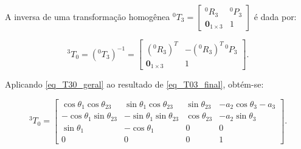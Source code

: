 


A inversa de uma transformação homogênea ${}^{0}T_{3}=\begin{bmatrix}{}^{0}R_{3} & {}^{0}P_{3}\\ \mathbf{0}_{1\times 3} & 1\end{bmatrix}$ é dada por:

\begin{equation}
{}^{3}T_{0} = ({}^{0}T_{3})^{-1}
=
\begin{bmatrix}
({}^{0}R_{3})^{T} & -({}^{0}R_{3})^{T}\,{}^{0}P_{3}\\
\mathbf{0}_{1\times 3} & 1
\end{bmatrix}.
\label{eq_T30_geral}
\end{equation}

Aplicando \eqref{eq_T30_geral} ao resultado de \eqref{eq_T03_final}, obtém-se:

\begin{equation}
{}^{3}T_{0} =
\begin{bmatrix}
\cos\theta_{1}\cos\theta_{23} & \sin\theta_{1}\cos\theta_{23} & \sin\theta_{23} & -a_2\cos\theta_{3}-a_3\\
-\cos\theta_{1}\sin\theta_{23} & -\sin\theta_{1}\sin\theta_{23} & \cos\theta_{23} & -a_2\sin\theta_{3}\\
\sin\theta_{1} & -\cos\theta_{1} & 0 & 0\\
0 & 0 & 0 & 1
\end{bmatrix}.
\label{eq_T30_final}
\end{equation}

